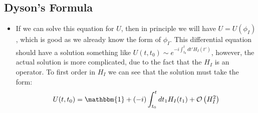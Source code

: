 \documentclass[11pt]{article}
\numberwithin{equation}{section}
\begin{document}
\subsection{Dyson's Formula} %
\label{sub:dyson_s_formula}
\begin{itemize}
  \item If we can solve this equation for $U$, then in principle we will have $U=U(\phi_I)$, which is good as we already know the form of $\phi_I$. This differential equation should have a solution something like $U(t,t_0) \sim e^{-i\int_{t_0}^t dt' H_I(t')}$, however, the actual solution is more complicated, due to the fact that the $H_I$ is an operator. To first order in $H_I$ we can see that the solution must take the form:
  \begin{align*}
    U(t,t_0) = \mathbbm{1} +(-i)\int_{t_0}^{t}dt_1H_{I}(t_1)+ \mathcal{O}\left(H_{I}^2\right)
  \end{align*}


\end{itemize}
\end{document}
